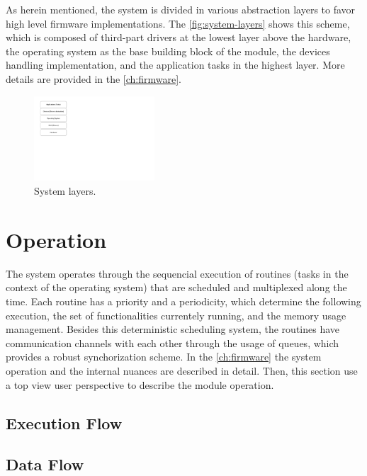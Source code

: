 As herein mentioned, the system is divided in various abstraction layers to favor high level firmware implementations. The \autoref{fig:system-layers} shows this scheme, which is composed of third-part drivers at the lowest layer above the hardware, the operating system as the base building block of the module, the devices handling implementation, and the application tasks in the highest layer. More details are provided in the \autoref{ch:firmware}.

\begin{figure}[!ht]
    \begin{center}
        \includegraphics[width=0.4\textwidth]{figures/system_layers.pdf}
        \caption{System layers.}
        \label{fig:system-layers}
    \end{center}
\end{figure}

\section{Operation}

The system operates through the sequencial execution of routines (tasks in the context of the operating system) that are scheduled and multiplexed along the time. Each routine has a priority and a periodicity, which determine the following execution, the set of functionalities currentely running, and the memory usage management. Besides this deterministic scheduling system, the routines have communication channels with each other through the usage of queues, which provides a robust synchorization scheme. In the \autoref{ch:firmware} the system operation and the internal nuances are described in detail. Then, this section use a top view user perspective to describe the module operation.

\subsection{Execution Flow}

\subsection{Data Flow}

